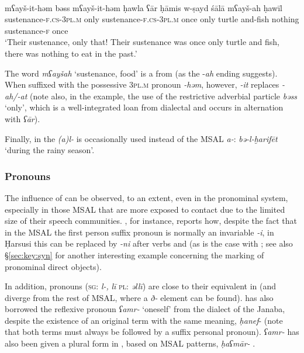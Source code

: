 \documentclass[output=paper]{langsci/langscibook}
\begin{document}
\ea
{}\\
\gll mʕayš-it-həm bəss mʕayš-it-həm ḥawla ʕār ḥāmis w-ṣayd śālā mʕayš-ah ḥawīl\\
     sustenance-\textsc{f.cs-3pl.m} only sustenance-\textsc{f.cs-3pl.m} once only turtle and-fish nothing sustenance-\textsc{f} once\\
\glt `Their sustenance, only that! Their sustenance was once only turtle and fish, there was nothing to eat in the past.'
\z
 

The word \textit{mʕayšah} ‘sustenance, food’ is a  from  (as the -\textit{ah} ending suggests). When suffixed with the possessive \textsc{3pl.m} pronoun \textit{-həm}, however,  \textit{-it} replaces \textit{-ah/-at} (note also, in the example, the use of the restrictive adverbial particle \textit{bəss} ‘only’, which is a well-integrated loan from dialectal  and occurs in alternation with  \textit{ʕār}). 

Finally, in  the    \textit{(a)l-} is occasionally used instead of the MSAL   \textit{a-}:  \textit{bə-l-ḫarifēt} ‘during the rainy season'.


 \subsubsection{Pronouns}\label{sec:key:pro}

The influence of  can be observed, to an extent, even in the pronominal system, especially in those MSAL that are more exposed to contact due to the limited size of their speech communities. \citet{Lonnet2011}, for instance, reports how, despite the fact that in the MSAL the first person suffix pronoun is normally an invariable \textit{-i}, in Ḥarsusi this can be replaced by \textit{-ni} after verbs and  (as is the case with ; see also §\ref{sec:key:syn} for another interesting example concerning the marking of pronominal direct objects).

In addition,   pronouns (\textsc{sg}: \textit{l-,} \textit{lī} \textsc{pl}: \textit{əllī}) are close to their equivalent in   (and diverge from the rest of MSAL, where a \textit{ð-} element can be found).  has also borrowed the reflexive pronoun \textit{ʕamr-} ‘oneself’ from the  dialect of the Janaba, despite the existence of an original  term with the same meaning, \textit{ḥanef}{}- (note that both terms must always be followed by a suffix personal pronoun). \textit{ʕamr-} has also been given a plural form in , based on MSAL  patterns, \textit{ḥaʕmār-} \citep[14]{Morris2017}.
\end{document}
